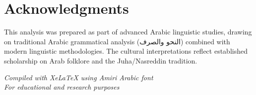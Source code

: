 \documentclass[letter,12pt]{article}
\begin{document}
\section*{Acknowledgments}

This analysis was prepared as part of advanced Arabic linguistic studies, drawing on traditional Arabic grammatical analysis (\textarabic{النحو والصرف}) combined with modern linguistic methodologies. The cultural interpretations reflect established scholarship on Arab folklore and the Juha/Nasreddin tradition.

\vfill
\begin{center}
\textit{Compiled with XeLaTeX using Amiri Arabic font}\\
\textit{For educational and research purposes}
\end{center}
\end{document}
